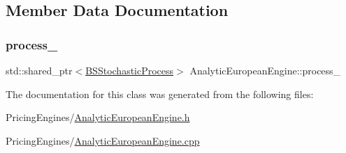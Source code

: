 \subsection{Member Data Documentation}
\hypertarget{class_analytic_european_engine_ae9464c6b8aa8b9321b37a8e18b9c785a}{}\label{class_analytic_european_engine_ae9464c6b8aa8b9321b37a8e18b9c785a} 
\subsubsection{\texorpdfstring{process\+\_\+}{process\_}}
{\footnotesize\ttfamily std\+::shared\+\_\+ptr$<$\hyperlink{class_b_s_stochastic_process}{B\+S\+Stochastic\+Process}$>$ Analytic\+European\+Engine\+::process\+\_\+\hspace{0.3cm}{\ttfamily [private]}}



The documentation for this class was generated from the following files\+:\begin{DoxyCompactItemize}
\item 
Pricing\+Engines/\hyperlink{_analytic_european_engine_8h}{Analytic\+European\+Engine.\+h}\item 
Pricing\+Engines/\hyperlink{_analytic_european_engine_8cpp}{Analytic\+European\+Engine.\+cpp}\end{DoxyCompactItemize}

